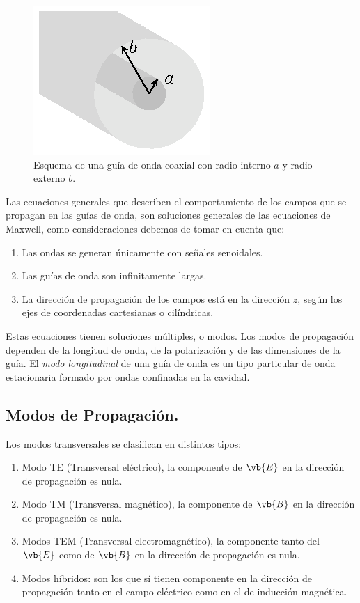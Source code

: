 \begin{figure}[H]
    \centering
    \includegraphics[scale=1.4]{Imagenes/Guia_Onda_Coaxial.eps}
    \caption{Esquema de una guía de onda coaxial con radio interno $a$ y radio externo $b$.}
    \label{fig:figura_02}
\end{figure}

Las ecuaciones generales que describen el comportamiento de los campos que se propagan en las guías de onda, son soluciones generales de las ecuaciones de Maxwell, como consideraciones debemos de tomar en cuenta que:
\begin{enumerate}
\item Las ondas se generan únicamente con señales senoidales.\item Las guías de onda son infinitamente largas.
\item La dirección de propagación de los campos está en la dirección $z$, según los ejes de coordenadas cartesianas o cilíndricas.
\end{enumerate}

Estas ecuaciones tienen soluciones múltiples, o modos. Los modos de propagación dependen de la longitud de onda, de la polarización y de las dimensiones de la guía. El \emph{modo longitudinal} de una guía de onda es un tipo particular de onda estacionaria formado por ondas confinadas en la cavidad.

\subsection{Modos de Propagación.}

Los modos transversales se clasifican en distintos tipos:
\begin{enumerate}[label=\roman*)]
\item Modo TE (Transversal eléctrico), la componente de $\vb{E}$ en la dirección de propagación es nula.
\item Modo TM (Transversal magnético), la componente de $\vb{B}$ en la dirección de propagación es nula.
\item Modos TEM (Transversal electromagnético), la componente tanto del $\vb{E}$ como de $\vb{B}$ en la dirección de propagación es nula.
\item Modos híbridos: son los que sí tienen componente en la dirección de propagación tanto en el campo eléctrico como en el de inducción magnética.
\end{enumerate}

